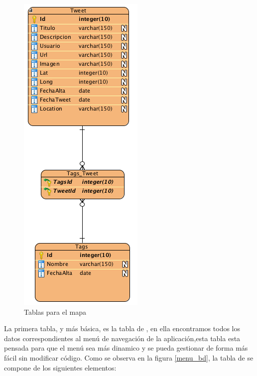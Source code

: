 \begin{figure}
\begin{center}
\includegraphics[scale=0.7]{imagenes/map.png}
\caption{Tablas para el mapa}
\label{map_bd}
\end{center}
\end{figure}


\vspace{5 mm}

La primera tabla, y más básica, es la tabla de , en ella encontramos todos los datos correspondientes al menú de navegación de la aplicación,esta tabla esta pensada para que el menú sea más dinamico y se pueda gestionar de forma más fácil sin modificar código. Como se observa en la figura \ref{menu_bd}, la tabla de  se compone de los siguientes elementos:

